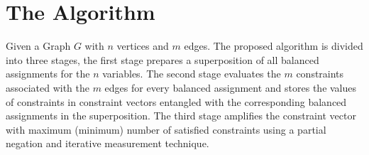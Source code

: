 \documentclass[a4paper]{article}
\begin{document}
\section{The Algorithm}

Given a Graph $G$ with $n$ vertices and $m$ edges. The proposed algorithm is divided into three stages, the first stage prepares 
a superposition of all balanced assignments for the $n$ variables. The second stage evaluates the $m$ constraints 
associated with the $m$ edges for every balanced assignment and stores the values of constraints 
in constraint vectors entangled with the corresponding balanced assignments in the superposition.
The third stage amplifies the constraint vector with maximum (minimum) number of satisfied constraints using 
a partial negation and iterative measurement technique.
\end{document}
